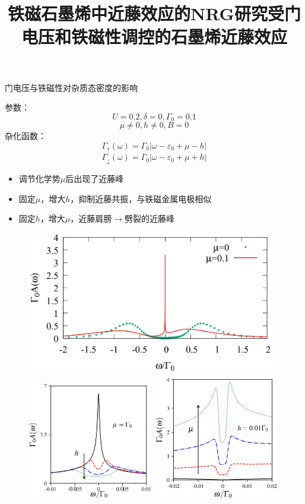 \documentclass[9pt,t]{beamer} %
\begin{document}
\title{铁磁石墨烯中近藤效应的NRG研究\qquad \qquad \qquad \qquad 受门电压和铁磁性调控的石墨烯近藤效应}
\begin{frame}{门电压与铁磁性对杂质态密度的影响}
\begin{minipage}[t]{0.45 \textwidth}
参数：
\[U=0.2,\delta=0,\Gamma_{0}=0.1\]
\[\mu\neq 0, h\neq 0, B=0\]
杂化函数：
\[
\Gamma_{\uparrow}(\omega)=\Gamma_{0}\left|\omega-\varepsilon_{0}+\mu- h\right|
\]
\[
\Gamma_{\downarrow}(\omega)=\Gamma_{0}\left|\omega-\varepsilon_{0}+\mu + h\right|
\]
\begin{itemize}
\setlength\itemsep{0.5em}
\item 调节化学势$\mu$后出现了近藤峰
\item 固定$\mu$，增大$h$，抑制近藤共振，与铁磁金属电极相似
\item 固定$h$，增大$\mu$，近藤肩膀$\rightarrow$劈裂的近藤峰
\end{itemize}
\end{minipage}%
\begin{minipage}[t]{0.55 \textwidth}
\begin{figure}
\includegraphics[width=0.97\textwidth]{dos-mu.png}\\
\includegraphics[width=0.49\textwidth]{dos-mu-h2.png}
\includegraphics[width=0.49\textwidth]{dos-mu-h1.png}

\end{figure}
\end{minipage}
\end{frame}
\end{document}
